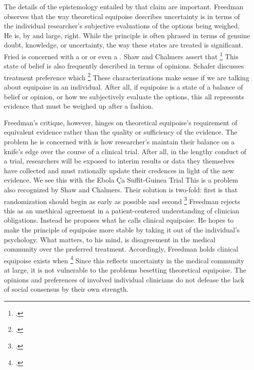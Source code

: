 \documentclass[letterpaper,notitlepage,12pt]{article}
\begin{document}
The details of the epistemology entailed by that claim are important.
Freedman observes that the way theoretical equipoise describes uncertainty is in
terms of the individual researcher's subjective evaluations of the options being
weighed.
He is, by and large, right.
While the principle is often phrased in terms of genuine doubt, knowledge, or
uncertainty, the way these states are treated is significant.
Fried is concerned with a  or or even a
.
Shaw and Chalmers assert that \footcite[p.
494]{shaw_ethics_1970}
This state of belief is also frequently described in terms of opinions.
Schafer discusses treatment preference which \footcite[p. 5]{schafer_commentary_1985}
These characterizations make sense if we are talking about equipoise in an
individual.
After all, if equipoise is a state of a balance of belief or opinion, or how we
subjectively evaluate the
options, this all represents evidence that must be weighed up after a fashion.

Freedman's critique, however, hinges on theoretical equipoise's requirement of
equivalent evidence rather than the quality or sufficiency of the evidence.
The problem he is concerned with is how researcher's maintain their balance on a
knife's edge over the course of a clinical trial.
After all, in the lengthy conduct of a trial, researchers will be exposed to
interim results or data they themselves have collected and must rationally
update their credences in light of the new evidence.
We see this with the Ebola \c{C}a Suffit-Guinea Trial
This is a problem also recognized by Shaw and Chalmers.
Their solution is two-fold: first is that randomization should begin as early as
possible and second \footcite[p. 493]{shaw_ethics_1970}
Freedman rejects this as an unethical agreement in a patient-centered
understanding of clinician obligations.
Instead he proposes what he calls clinical equipoise.
He hopes to make the principle of equipoise more stable by taking it out of the individual's
psychology.
What matters, to his mind, is disagreement in the medical community over the
preferred treatment.
Accordingly, Freedman holds clinical equipoise exists when \footcite[p.
430]{freedman_equipoise_1987}
Since this reflects uncertainty in the medical community at large, it is not
vulnerable to the problems besetting theoretical equipoise.
The opinions and preferences of involved individual clinicians do not defease the
lack of social consensus by their own strength.
\end{document}
